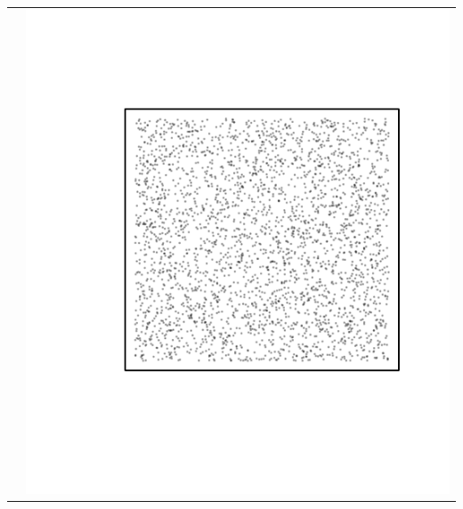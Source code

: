 \documentclass{article}\usepackage{graphicx, color}
\makeatletter
\def\maxwidth{ %
  \ifdim\Gin@nat@width>\linewidth
    \linewidth
  \else
    \Gin@nat@width
  \fi
}
\newenvironment{knitrout}{}{} %
\makeatother
\begin{document}
\begin{tabular}{cc}
&
\begin{knitrout}
\definecolor{shadecolor}{rgb}{0.969, 0.969, 0.969}\color{fgcolor}\includegraphics[width=\maxwidth]{figure/unnamed-chunk-28} 
\end{knitrout}

\\
\end{tabular}
\end{document}
